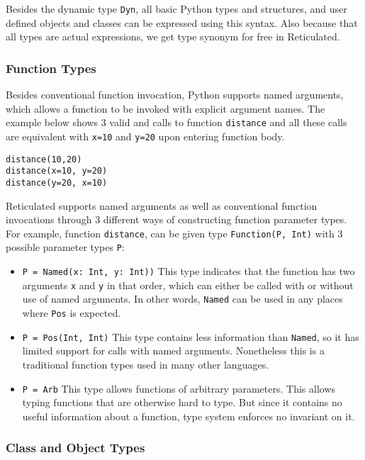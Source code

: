 Besides the dynamic type \texttt{Dyn}, all basic Python types and structures,
and user defined objects and classes
can be expressed using this syntax.
Also because that all types are actual expressions, we get type synonym for free in Reticulated.

\subsubsection{Function Types}

Besides conventional function invocation, Python 
supports named arguments, which allows a function to be invoked
with explicit argument names. The example below shows 3 valid
and calls to function \texttt{distance}
and all these calls are equivalent with
\texttt{x=10} and \texttt{y=20} upon entering function body.

\begin{verbatim}
distance(10,20)
distance(x=10, y=20)
distance(y=20, x=10)
\end{verbatim}

Reticulated supports named arguments as well as conventional 
function invocations through 3 different ways of constructing
function parameter types. For example,
function \texttt{distance}, can be given type \texttt{Function(P, Int)} with 3 possible parameter types \texttt{P}:


\begin{itemize}
	\item \texttt{P = Named(x: Int, y: Int))} This type
	indicates that the function has two arguments \texttt{x} and \texttt{y} in that order, which can either be called with or without use of named arguments. In other words, \texttt{Named} can be used in any places where \texttt{Pos} is expected.
	
	\item \texttt{P = Pos(Int, Int)} This type contains less
	information than \texttt{Named}, so it has limited support for
	calls with named arguments. Nonetheless this is a traditional
	function types used in many other languages.
	
	\item \texttt{P = Arb} This type allows functions of arbitrary
	parameters. This allows typing functions that are otherwise
	hard to type. But since it contains no useful information
	about a function, type system enforces no invariant on it.
\end{itemize}

\subsubsection{Class and Object Types}

